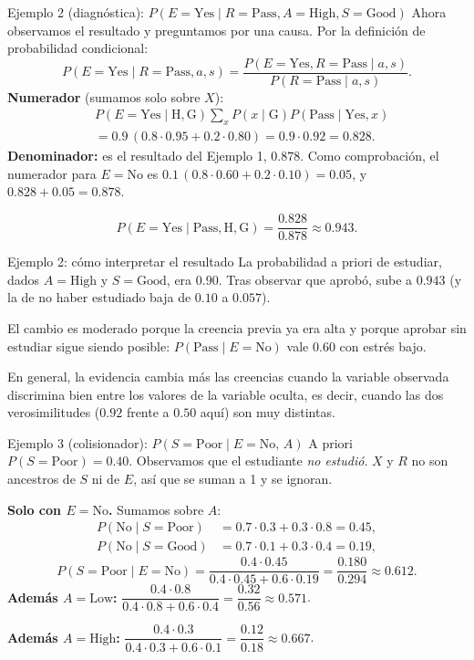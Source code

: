 \documentclass[11pt]{beamer}
\newcommand{\Pp}[1]{P\!\left(#1\right)}
\begin{document}
\begin{frame}{Ejemplo 2 (diagnóstica): $\Pp{E=\text{Yes}\mid R=\text{Pass},A=\text{High},S=\text{Good}}$}
  Ahora observamos el resultado y preguntamos por una causa. Por la definición de probabilidad condicional:
  \[
    \Pp{E=\text{Yes}\mid R=\text{Pass},a,s}=\frac{\Pp{E=\text{Yes},R=\text{Pass}\mid a,s}}{\Pp{R=\text{Pass}\mid a,s}}.
  \]
  \textbf{Numerador} (sumamos solo sobre $X$):
  \begin{align*}
    &\Pp{E=\text{Yes}\mid\text{H},\text{G}}\sum_{x}\Pp{x\mid\text{G}}\Pp{\text{Pass}\mid\text{Yes},x}\\
    &=0.9\,(0.8\cdot0.95+0.2\cdot0.80)=0.9\cdot0.92=0.828.
  \end{align*}
  \textbf{Denominador:} es el resultado del Ejemplo 1, $0.878$. Como comprobación, el numerador para $E=\text{No}$ es $0.1\,(0.8\cdot0.60+0.2\cdot0.10)=0.05$, y $0.828+0.05=0.878$.

  \[
    \Pp{E=\text{Yes}\mid\text{Pass},\text{H},\text{G}}=\frac{0.828}{0.878}\approx 0.943.
  \]
\end{frame}

\begin{frame}{Ejemplo 2: cómo interpretar el resultado}
  La probabilidad a priori de estudiar, dados $A=\text{High}$ y $S=\text{Good}$, era $0.90$. Tras observar que aprobó, sube a $0.943$ (y la de no haber estudiado baja de $0.10$ a $0.057$).

  \medskip
  El cambio es moderado porque la creencia previa ya era alta y porque aprobar sin estudiar sigue siendo posible: $\Pp{\text{Pass}\mid E=\text{No}}$ vale $0.60$ con estrés bajo.

  \medskip
  En general, la evidencia cambia más las creencias cuando la variable observada discrimina bien entre los valores de la variable oculta, es decir, cuando las dos verosimilitudes ($0.92$ frente a $0.50$ aquí) son muy distintas.
\end{frame}

\begin{frame}{Ejemplo 3 (colisionador): $\Pp{S=\text{Poor}\mid E=\text{No},\,A}$}
  A priori $\Pp{S=\text{Poor}}=0.40$. Observamos que el estudiante \emph{no estudió}. $X$ y $R$ no son ancestros de $S$ ni de $E$, así que se suman a 1 y se ignoran.

  \medskip
  \textbf{Solo con $E=\text{No}$.} Sumamos sobre $A$:
  \begin{align*}
    \Pp{\text{No}\mid S=\text{Poor}}&=0.7\cdot0.3+0.3\cdot0.8=0.45,\\
    \Pp{\text{No}\mid S=\text{Good}}&=0.7\cdot0.1+0.3\cdot0.4=0.19,
  \end{align*}
  \[
    \Pp{S=\text{Poor}\mid E=\text{No}}=\frac{0.4\cdot0.45}{0.4\cdot0.45+0.6\cdot0.19}=\frac{0.180}{0.294}\approx0.612.
  \]
  \textbf{Además $A=\text{Low}$:} $\dfrac{0.4\cdot0.8}{0.4\cdot0.8+0.6\cdot0.4}=\dfrac{0.32}{0.56}\approx0.571$.

  \textbf{Además $A=\text{High}$:} $\dfrac{0.4\cdot0.3}{0.4\cdot0.3+0.6\cdot0.1}=\dfrac{0.12}{0.18}\approx0.667$.
\end{frame}
\end{document}
